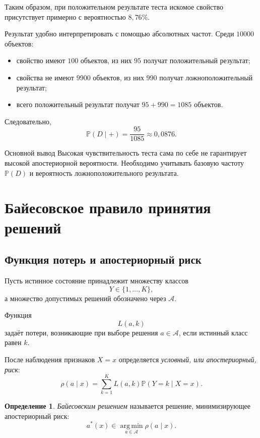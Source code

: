 \documentclass[12pt,a4paper]{article}
\theoremstyle{plain}
\theoremstyle{definition}
\newtheorem{definition}[theorem]{Определение}
\theoremstyle{remark}
\newcommand{\Pp}{\mathbb{P}}
\newcommand{\argmin}{\operatorname*{arg\,min}}
\begin{document}
Таким образом, при положительном результате теста искомое свойство
присутствует примерно с вероятностью $8{,}76\%$.

Результат удобно интерпретировать с помощью абсолютных частот. Среди
$10000$ объектов:
\begin{itemize}
    \item свойство имеют $100$ объектов, из них $95$ получат положительный
    результат;
    \item свойства не имеют $9900$ объектов, из них $990$ получат
    ложноположительный результат;
    \item всего положительный результат получат $95+990=1085$ объектов.
\end{itemize}
Следовательно,
\[
    \Pp(D\mid +)
    =
    \frac{95}{1085}
    \approx 0{,}0876.
\]

\begin{importantblock}{Основной вывод}
Высокая чувствительность теста сама по себе не гарантирует высокой
апостериорной вероятности. Необходимо учитывать базовую частоту
$\Pp(D)$ и вероятность ложноположительного результата.
\end{importantblock}

\section{Байесовское правило принятия решений}

\subsection{Функция потерь и апостериорный риск}

Пусть истинное состояние принадлежит множеству классов
\[
    Y\in\{1,\ldots,K\},
\]
а множество допустимых решений обозначено через $\mathcal{A}$.

Функция
\[
    L(a,k)
\]
задаёт потери, возникающие при выборе решения $a\in\mathcal{A}$, если
истинный класс равен $k$.

После наблюдения признаков $X=x$ определяется \emph{условный, или
апостериорный, риск}:
\[
    \rho(a\mid x)
    =
    \sum_{k=1}^{K}
    L(a,k)\Pp(Y=k\mid X=x).
\]

\begin{definition}
\emph{Байесовским решением} называется решение, минимизирующее
апостериорный риск:
\[
    a^*(x)
    \in
    \argmin_{a\in\mathcal{A}}
    \rho(a\mid x).
\]
\end{definition}
\end{document}
